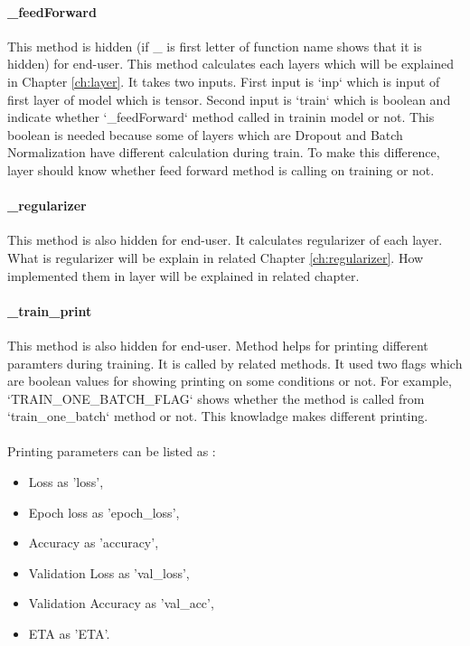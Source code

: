 \documentclass[12pt]{report}
\begin{document}
\paragraph{\_feedForward}
This method is hidden (if \_ is first letter of function name shows that it is hidden) for end-user. This method calculates each layers which will be explained in Chapter \ref{ch:layer}. It takes two inputs. First input is `inp` which is input of first layer of model which is tensor. Second input is `train` which is boolean and indicate whether `\_feedForward` method called in trainin model or not. This boolean is needed because some of layers which are Dropout and Batch Normalization have different calculation during train. To make this difference, layer should know whether feed forward method is calling on training or not.

\paragraph{\_regularizer}
This method is also hidden for end-user. It calculates regularizer of each layer. What is regularizer will be explain in related Chapter \ref{ch:regularizer}. How implemented them in layer will be explained in related chapter.

\paragraph{\_train\_print}
This method is also hidden for end-user. Method helps for printing different paramters during training. It is called by related methods. It used two flags which are boolean values for showing printing on some conditions or not. For example, `TRAIN\_ONE\_BATCH\_FLAG` shows whether the method is called from `train\_one\_batch` method or not. This knowladge makes different printing. 

\paragraph{}
Printing parameters can be listed as :

\begin{itemize}
	\item	 Loss                  as 'loss',
	\item	 Epoch loss            as 'epoch\_loss',
	\item	 Accuracy              as 'accuracy',
	\item	 Validation Loss       as 'val\_loss',
	\item	 Validation Accuracy   as 'val\_acc',
	\item	 ETA                   as 'ETA'. 
\end{itemize}
\end{document}
